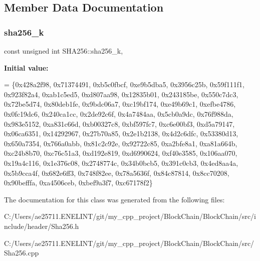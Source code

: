\subsection{Member Data Documentation}
\mbox{\label{class_s_h_a256_ab21ac6c6f796a614ee11b94a9ccf3a5c}} 
\subsubsection{\texorpdfstring{sha256\+\_\+k}{sha256\_k}}
{\footnotesize\ttfamily const unsigned int S\+H\+A256\+::sha256\+\_\+k\hspace{0.3cm}{\ttfamily [static]}, {\ttfamily [protected]}}

{\bfseries Initial value\+:}
\begin{DoxyCode}
= 
            \{0x428a2f98, 0x71374491, 0xb5c0fbcf, 0xe9b5dba5,
             0x3956c25b, 0x59f111f1, 0x923f82a4, 0xab1c5ed5,
             0xd807aa98, 0x12835b01, 0x243185be, 0x550c7dc3,
             0x72be5d74, 0x80deb1fe, 0x9bdc06a7, 0xc19bf174,
             0xe49b69c1, 0xefbe4786, 0x0fc19dc6, 0x240ca1cc,
             0x2de92c6f, 0x4a7484aa, 0x5cb0a9dc, 0x76f988da,
             0x983e5152, 0xa831c66d, 0xb00327c8, 0xbf597fc7,
             0xc6e00bf3, 0xd5a79147, 0x06ca6351, 0x14292967,
             0x27b70a85, 0x2e1b2138, 0x4d2c6dfc, 0x53380d13,
             0x650a7354, 0x766a0abb, 0x81c2c92e, 0x92722c85,
             0xa2bfe8a1, 0xa81a664b, 0xc24b8b70, 0xc76c51a3,
             0xd192e819, 0xd6990624, 0xf40e3585, 0x106aa070,
             0x19a4c116, 0x1e376c08, 0x2748774c, 0x34b0bcb5,
             0x391c0cb3, 0x4ed8aa4a, 0x5b9cca4f, 0x682e6ff3,
             0x748f82ee, 0x78a5636f, 0x84c87814, 0x8cc70208,
             0x90befffa, 0xa4506ceb, 0xbef9a3f7, 0xc67178f2\}
\end{DoxyCode}


The documentation for this class was generated from the following files\+:\begin{DoxyCompactItemize}
\item 
C\+:/\+Users/ae25711.\+E\+N\+E\+L\+I\+N\+T/git/my\+\_\+cpp\+\_\+project/\+Block\+Chain/\+Block\+Chain/src/include/header/Sha256.\+h\item 
C\+:/\+Users/ae25711.\+E\+N\+E\+L\+I\+N\+T/git/my\+\_\+cpp\+\_\+project/\+Block\+Chain/\+Block\+Chain/src/Sha256.\+cpp\end{DoxyCompactItemize}
